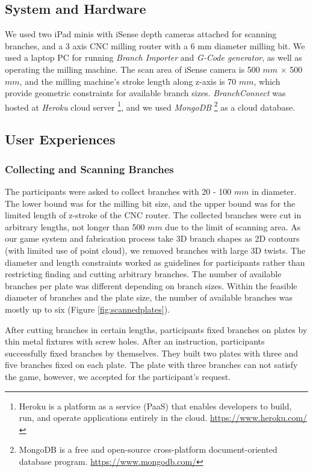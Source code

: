 \subsection{System and Hardware}
We used two iPad minis with iSense depth cameras attached for scanning branches, and a 3 axis CNC milling router with a 6 mm diameter milling bit.
We used a laptop PC for running \textit{Branch Importer} and \textit{G-Code generator}, as well as operating the milling machine.
The scan area of iSense camera is 500 $mm$ $\times$ 500 $mm$, and the milling machine's stroke length along z-axis is 70 $mm$, which provide geometric constraints for available branch sizes.
\textit{BranchConnect} was hosted at \textit{Heroku} cloud server \footnote{Heroku is a platform as a service (PaaS) that enables developers to build, run, and operate applications entirely in the cloud. \url{https://www.heroku.com/}},
and we used \textit{MongoDB} \footnote{MongoDB is a free and open-source cross-platform document-oriented database program. \url{https://www.mongodb.com/}} as a cloud database.

\subsection{User Experiences}
\subsubsection*{Collecting and Scanning Branches}
The participants were asked to collect branches with 20 - 100 $mm$ in diameter.
The lower bound was for the milling bit size, and the upper bound was for the limited length of z-stroke of the CNC router.
The collected branches were cut in arbitrary lengths, not longer than 500 $mm$ due to the limit of scanning area.
As our game system and fabrication process take 3D branch shapes as 2D contours (with limited use of point cloud), we removed branches with large 3D twists.
The diameter and length constraints worked as guidelines for participants rather than restricting finding and cutting arbitrary branches.
The number of available branches per plate was different depending on branch sizes.
Within the feasible diameter of branches and the plate size, the number of available branches was mostly up to six (Figure \ref{fig:scannedplates}).

After cutting branches in certain lengths, participants fixed branches on plates by thin metal fixtures with screw holes.
After an instruction, participants successfully fixed branches by themselves.
They built two plates with three and five branches fixed on each plate.
The plate with three branches can not satisfy the game, however, we accepted for the participant's request.

